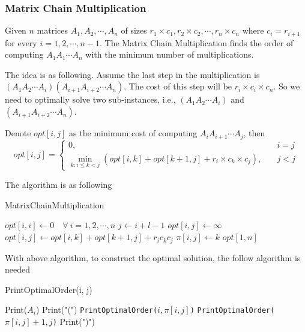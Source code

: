 					\subsubsection{Matrix Chain Multiplication}
						Given $n$ matrices $A_1, A_2, \cdots, A_n$ of sizes $r_1 \times c_1, r_2 \times c_2, \cdots, r_n \times c_n$ where $c_i = r_{i + 1}$ for every $i = 1, 2, \cdots, n - 1$. The Matrix Chain Multiplication finds the order of computing $A_1A_1\cdots A_n$ with the minimum number of multiplications.

						The idea is as following. Assume the last step in the multiplication is $(A_1A_2\cdots A_i)(A_{i + 1}A_{i + 2}\cdots A_n)$. The cost of this step will be $r_i \times c_i \times c_n$. So we need to optimally solve two sub-instances, i.e., $(A_1A_2\cdots A_i)$ and $(A_{i + 1}A_{i + 2}\cdots A_n)$.

						Denote $opt[i, j]$ as the minimum cost of computing $A_i A_{i+1} \cdots A_j$, then
						\begin{equation}
							opt[i, j] = \begin{cases}
								0, & \quad i = j\\
								\min_{k: i \le k < j} (opt[i, k] + opt[k + 1, j] + r_i \times c_k \times c_j), & \quad j < j
							\end{cases}
						\end{equation}

						The algorithm is as following
						\begin{algorithm}[h]
							\caption{MatrixChainMultiplication}
							\begin{algorithmic}[1]
								\State $opt[i, i] \gets 0 \quad \forall ~ i = 1, 2, \cdots, n$
										\State $j \gets i + l - 1$
										\State $opt[i, j] \gets \infty$
											\If {$opt[i, k] + opt[k + 1, j + r_ic_kc_j < opt[i, j]$}
												\State $opt[i, j] \gets opt[i, k] + opt[k + 1, j] + r_i c_k c_j$
												\State $\pi[i, j] \gets k$
											\EndIf
										\EndFor
									\EndFor
								\EndFor
								\State \Return $opt[1, n]$
							\end{algorithmic}
						\end{algorithm}

						With above algorithm, to construct the optimal solution, the follow algorithm is needed
						\begin{algorithm}[h]
							\caption{PrintOptimalOrder(i, j)}
							\begin{algorithmic}[1]
									\State Print($A_i$)
								\Else
									\State Print("(")
									\State \texttt{PrintOptimalOrder($i, \pi[i, j]$)}
									\State \texttt{PrintOptimalOrder($\pi[i, j] + 1, j$)}
									\State Print(")")
								\EndIf
							\end{algorithmic}
						\end{algorithm}
					
